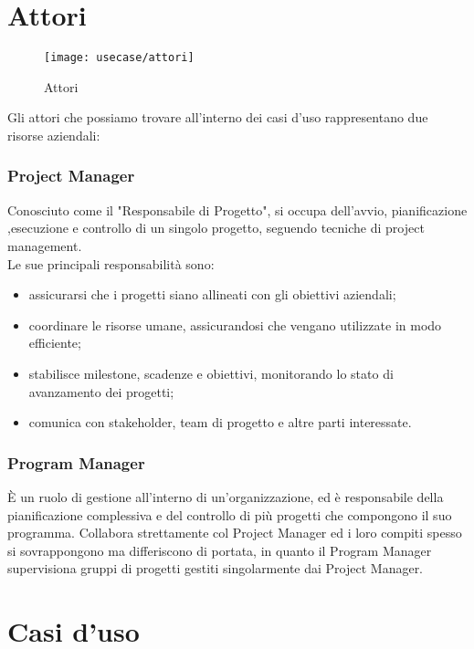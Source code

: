 \section{Attori}
\begin{figure}[H] 
    \centering 
    \texttt{[image: usecase/attori]} 
    \caption{Attori}
\end{figure}
Gli attori che possiamo trovare all'interno dei casi d'uso rappresentano due risorse aziendali:
\subsubsection*{Project Manager}
Conosciuto come il "Responsabile di Progetto", si occupa dell'avvio, pianificazione ,esecuzione e controllo di un singolo progetto, seguendo tecniche di project management.\\
Le sue principali responsabilità sono:
\begin{itemize}
\item assicurarsi che i progetti siano allineati con gli obiettivi aziendali;
\item coordinare le risorse umane, assicurandosi che vengano utilizzate in modo efficiente;
\item stabilisce milestone, scadenze e obiettivi, monitorando lo stato di avanzamento dei progetti;
\item comunica con stakeholder, team di progetto e altre parti interessate.
\end{itemize}
\subsubsection*{Program Manager}
È un ruolo di gestione all'interno di un'organizzazione, ed è responsabile della pianificazione complessiva e del controllo di più progetti che compongono il suo programma. Collabora strettamente col Project Manager ed i loro compiti spesso si sovrappongono ma differiscono di portata, in quanto il Program Manager supervisiona gruppi di progetti gestiti singolarmente dai Project Manager.

\section{Casi d'uso}












 

